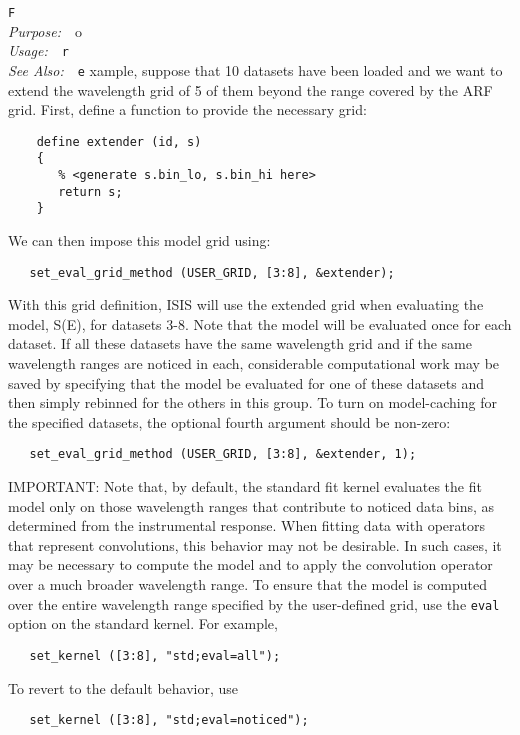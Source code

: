 \documentclass{book}
\makeatletter
\newif\ifpdf
\newenvironment{isisfunction}[4]%
{\index{{#1}@{\tt #1}}%
  \ifpdf
  \else
     \addcontentsline{toc}{subsection}{{#1} -- {#2}}
  \fi
  \vbox{
          \vspace*{\baselineskip}
          {\LARGE\tt #1}\vspace*{\baselineskip}\\
          {{\it Purpose:}~~{#2}}\\
          {{\it Usage:}~~{\tt #3}}\\
          {{\it See Also:}~~{\tt #4}}
       }
}%
{ }
\makeatother
\begin{document}
\begin{isisfunction}
For example, suppose that 10 datasets have been loaded
and we want to extend the wavelength grid of 5 of them
beyond the range covered by the ARF grid.  First, define
a function to provide the necessary grid:
\begin{verbatim}
    define extender (id, s)
    {
       % <generate s.bin_lo, s.bin_hi here>
       return s;
    }
\end{verbatim}
We can then impose this model grid using:
\begin{verbatim}
   set_eval_grid_method (USER_GRID, [3:8], &extender);
\end{verbatim}
With this grid definition, ISIS will use the extended grid when
evaluating the model, S(E), for datasets 3-8. Note that the
model will be evaluated once for each dataset. If all these
datasets have the same wavelength grid and if the same
wavelength ranges are noticed in each, considerable
computational work may be saved by specifying that the model be
evaluated for one of these datasets and then simply rebinned
for the others in this group. To turn on model-caching for the
specified datasets, the optional fourth argument should be
non-zero:
\begin{verbatim}
   set_eval_grid_method (USER_GRID, [3:8], &extender, 1);
\end{verbatim}

IMPORTANT: Note that, by default, the standard fit kernel
evaluates the fit model only on those wavelength ranges that
contribute to noticed data bins, as determined from the
instrumental response.  When fitting data with operators that
represent convolutions, this behavior may not be desirable.
In such cases, it may be necessary to compute the model and to
apply the convolution operator over a much broader wavelength
range. To ensure that the model is computed over the entire
wavelength range specified by the user-defined grid, use the
\verb|eval| option on the standard kernel.  For example,
\begin{verbatim}
   set_kernel ([3:8], "std;eval=all");
\end{verbatim}
To revert to the default behavior, use
\begin{verbatim}
   set_kernel ([3:8], "std;eval=noticed");
\end{verbatim}
\end{isisfunction}
\end{document}
